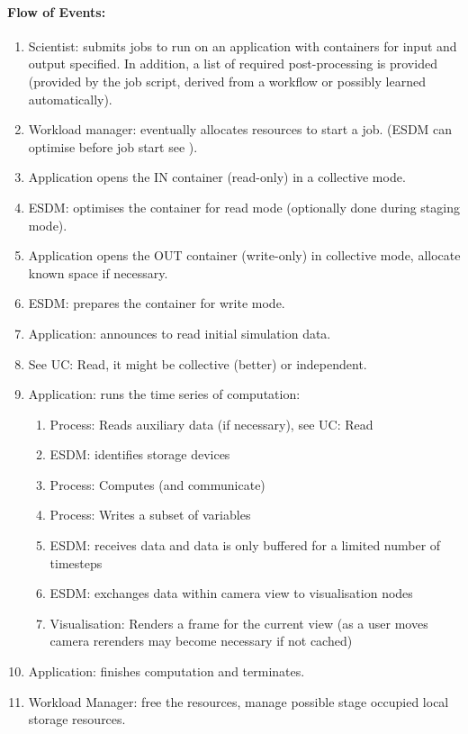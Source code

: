 \paragraph{Flow of Events:}
\begin{enumerate}
	\item Scientist: submits jobs to run on an application with containers for input and output specified. In addition, a list of required post-processing is provided (provided by the job script, derived from a workflow or possibly learned automatically).
	\item Workload manager: eventually allocates resources to start a job. (ESDM can optimise before job start see ).
	\item Application opens the IN container (read-only) in a collective mode.
	\item ESDM: optimises the container for read mode (optionally done during staging mode).
	\item Application opens the OUT container (write-only) in collective mode, allocate known space if necessary.
	\item ESDM: prepares the container for write mode.
	\item Application: announces to read initial simulation data.
	\item See UC: Read, it might be collective (better) or independent.
	\item Application: runs the time series of computation:
	\begin{enumerate}
		\item Process: Reads auxiliary data (if necessary), see UC: Read
		\item ESDM: identifies storage devices
		\item Process: Computes (and communicate)
		\item Process: Writes a subset of variables
		\item ESDM: receives data and data is only buffered for a limited number of timesteps
		\item ESDM: exchanges data within camera view to visualisation nodes
		\item Visualisation: Renders a frame for the current view (as a user moves camera rerenders may become necessary if not cached)
	\end{enumerate}
	\item Application: finishes computation and terminates.
	\item Workload Manager: free the resources, manage possible stage occupied local storage resources.
\end{enumerate}


